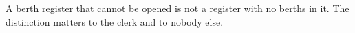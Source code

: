 \documentclass{article}
\begin{document}
A berth register that cannot be opened is not a register with no berths in
it. The distinction matters to the clerk and to nobody else.
\end{document}
